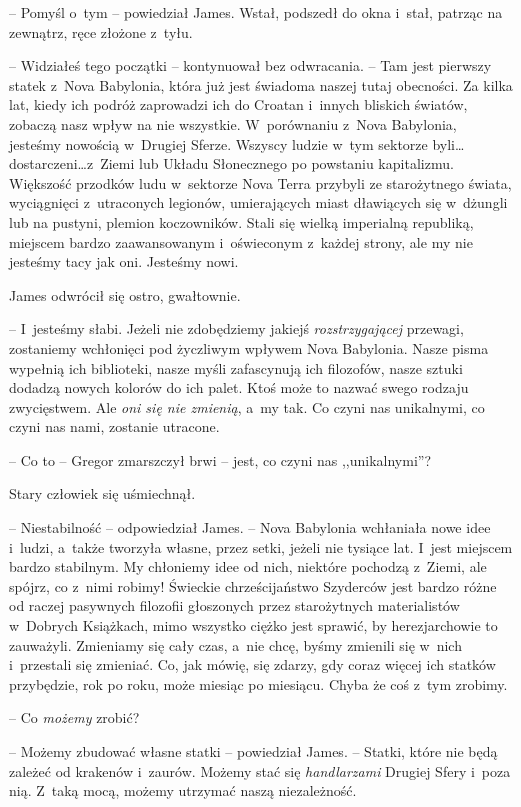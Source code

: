 \documentclass[oneside,polish,12pt,sfheadings]{mwbk}
\begin{document}
-- Pomyśl o~tym -- powiedział James. Wstał, podszedł do okna i~stał,
patrząc na zewnątrz, ręce złożone z~tyłu.

-- Widziałeś tego początki -- kontynuował bez odwracania. -- Tam jest
pierwszy statek z~Nova Babylonia, która już jest świadoma naszej tutaj
obecności. Za kilka lat, kiedy ich podróż zaprowadzi ich do Croatan i~innych bliskich światów, zobaczą nasz wpływ na nie wszystkie. W~porównaniu z~Nova Babylonia, jesteśmy nowością w~Drugiej Sferze. Wszyscy
ludzie w~tym sektorze byli\ldots dostarczeni\ldots z~Ziemi lub Układu
Słonecznego po powstaniu kapitalizmu. Większość przodków ludu w~sektorze
Nova Terra przybyli ze starożytnego świata, wyciągnięci z~utraconych
legionów, umierających miast dławiących się w~dżungli lub na pustyni,
plemion koczowników. Stali się wielką imperialną republiką, miejscem
bardzo zaawansowanym i~oświeconym z~każdej strony, ale my nie jesteśmy
tacy jak oni. Jesteśmy nowi.

James odwrócił się ostro, gwałtownie. 

-- I~jesteśmy słabi. Jeżeli nie
zdobędziemy jakiejś \emph{rozstrzygającej} przewagi, zostaniemy
wchłonięci pod życzliwym wpływem Nova Babylonia. Nasze pisma wypełnią
ich biblioteki, nasze myśli zafascynują ich filozofów, nasze sztuki
dodadzą nowych kolorów do ich palet. Ktoś może to nazwać swego rodzaju
zwycięstwem. Ale \emph{oni się nie zmienią}, a~my tak. Co czyni nas
unikalnymi, co czyni nas nami, zostanie utracone.

-- Co to -- Gregor zmarszczył brwi -- jest, co czyni nas ,,unikalnymi''?

Stary człowiek się uśmiechnął.

-- Niestabilność -- odpowiedział James. -- Nova Babylonia wchłaniała nowe
idee i~ludzi, a~także tworzyła własne, przez setki, jeżeli nie tysiące
lat. I~jest miejscem bardzo stabilnym. My chłoniemy idee od nich,
niektóre pochodzą z~Ziemi, ale spójrz, co z~nimi robimy! Świeckie
chrześcijaństwo Szyderców jest bardzo różne od raczej pasywnych
filozofii głoszonych przez starożytnych materialistów w~Dobrych
Książkach, mimo wszystko ciężko jest sprawić, by herezjarchowie to
zauważyli. Zmieniamy się cały czas, a~nie chcę, byśmy zmienili się w~nich i~przestali się zmieniać. Co, jak mówię, się zdarzy, gdy coraz
więcej ich statków przybędzie, rok po roku, może miesiąc po miesiącu.
Chyba że coś z~tym zrobimy.

-- Co \emph{możemy} zrobić?

-- Możemy zbudować własne statki -- powiedział James. -- Statki, które nie
będą zależeć od krakenów i~zaurów. Możemy stać się \emph{handlarzami}
Drugiej Sfery i~poza nią. Z~taką mocą, możemy utrzymać naszą
niezależność.
\end{document}
